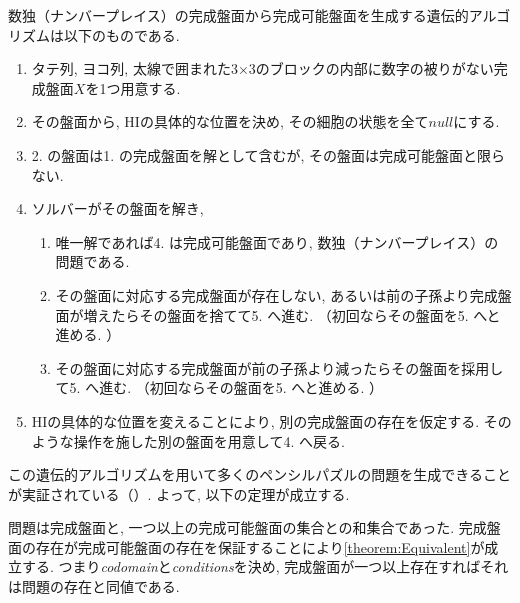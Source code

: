 \begin{example}[遺伝的アルゴリズム]
  数独（ナンバープレイス）の完成盤面から完成可能盤面を生成する遺伝的アルゴリズムは以下のものである.
  \begin{enumerate}
    \item タテ列, ヨコ列, 太線で囲まれた3$\times$3のブロックの内部に数字の被りがない完成盤面$X$を1つ用意する.
    \item その盤面から, HIの具体的な位置を決め, その細胞の状態を全て$null$にする.
    \item 2. の盤面は1. の完成盤面を解として含むが, その盤面は完成可能盤面と限らない.
    \item ソルバーがその盤面を解き,
          \begin{enumerate}
            \item 唯一解であれば4. は完成可能盤面であり, 数独（ナンバープレイス）の問題である.
            \item その盤面に対応する完成盤面が存在しない, あるいは前の子孫より完成盤面が増えたらその盤面を捨てて5. へ進む. （初回ならその盤面を5. へと進める. ）
            \item その盤面に対応する完成盤面が前の子孫より減ったらその盤面を採用して5. へ進む. （初回ならその盤面を5. へと進める. ）
          \end{enumerate}
    \item HIの具体的な位置を変えることにより, 別の完成盤面の存在を仮定する. そのような操作を施した別の盤面を用意して4. へ戻る.
  \end{enumerate}
\end{example}

この遺伝的アルゴリズムを用いて多くのペンシルパズルの問題を生成できることが実証されている（\cite{Fujiwara2022}）. よって, 以下の定理が成立する.

問題は完成盤面と, 一つ以上の完成可能盤面の集合との和集合であった. 完成盤面の存在が完成可能盤面の存在を保証することにより\cref{theorem:Equivalent}が成立する. つまり\textit{codomain}と\textit{conditions}を決め, 完成盤面が一つ以上存在すればそれは問題の存在と同値である.
